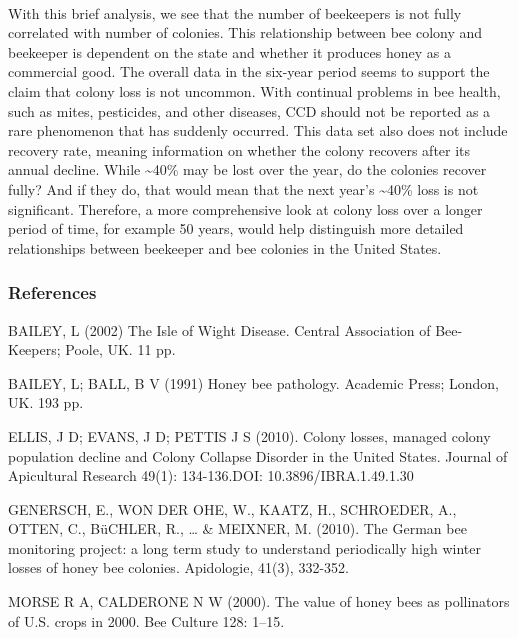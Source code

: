 \documentclass[11pt]{article}
\begin{document}
    \begin{center}
    \end{center}
    { \hspace*{\fill} \\}
    
    With this brief analysis, we see that the number of beekeepers is not
fully correlated with number of colonies. This relationship between bee
colony and beekeeper is dependent on the state and whether it produces
honey as a commercial good. The overall data in the six-year period
seems to support the claim that colony loss is not uncommon. With
continual problems in bee health, such as mites, pesticides, and other
diseases, CCD should not be reported as a rare phenomenon that has
suddenly occurred. This data set also does not include recovery rate,
meaning information on whether the colony recovers after its annual
decline. While \textasciitilde{}40\% may be lost over the year, do the
colonies recover fully? And if they do, that would mean that the next
year's \textasciitilde{}40\% loss is not significant. Therefore, a more
comprehensive look at colony loss over a longer period of time, for
example 50 years, would help distinguish more detailed relationships
between beekeeper and bee colonies in the United States.

    \hypertarget{references}{%
\subsubsection{References}\label{references}}

BAILEY, L (2002) The Isle of Wight Disease. Central Association of
Bee-Keepers; Poole, UK. 11 pp.

BAILEY, L; BALL, B V (1991) Honey bee pathology. Academic Press; London,
UK. 193 pp.

ELLIS, J D; EVANS, J D; PETTIS J S (2010). Colony losses, managed colony
population decline and Colony Collapse Disorder in the United States.
Journal of Apicultural Research 49(1): 134-136.DOI:
10.3896/IBRA.1.49.1.30

GENERSCH, E., WON DER OHE, W., KAATZ, H., SCHROEDER, A., OTTEN, C.,
BüCHLER, R., \ldots{} \& MEIXNER, M. (2010). The German bee monitoring
project: a long term study to understand periodically high winter losses
of honey bee colonies. Apidologie, 41(3), 332-352.

MORSE R A, CALDERONE N W (2000). The value of honey bees as pollinators
of U.S. crops in 2000. Bee Culture 128: 1--15.
\end{document}
